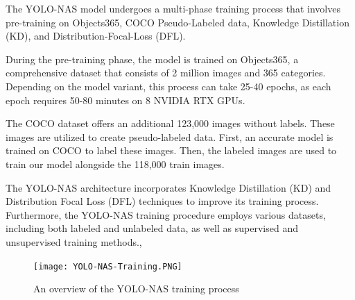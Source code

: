 The YOLO-NAS model undergoes a multi-phase training process that involves pre-training on Objects365, COCO Pseudo-Labeled data, Knowledge Distillation (KD), and Distribution-Focal-Loss (DFL).

During the pre-training phase, the model is trained on Objects365, a comprehensive dataset that consists of 2 million images and 365 categories. Depending on the model variant, this process can take 25-40 epochs, as each epoch requires 50-80 minutes on 8 NVIDIA RTX GPUs. 

The COCO dataset offers an additional 123,000 images without labels. These images are utilized to create pseudo-labeled data. First, an accurate model is trained on COCO to label these images. Then, the labeled images are used to train our model alongside the 118,000 train images.

The YOLO-NAS architecture incorporates Knowledge Distillation (KD) and Distribution Focal Loss (DFL) techniques to improve its training process. Furthermore, the YOLO-NAS training procedure employs various datasets, including both labeled and unlabeled data, as well as supervised and unsupervised training methods.\cite{YOLO-NAS}, \cite{terven2023comprehensive}
\begin{figure}[H]
    \centering
    \texttt{[image: YOLO-NAS-Training.PNG]}
    \caption{An overview of the YOLO-NAS training process \cite{richmond_yolo-nas}}
    \label{fig:enter-label}
\end{figure}


